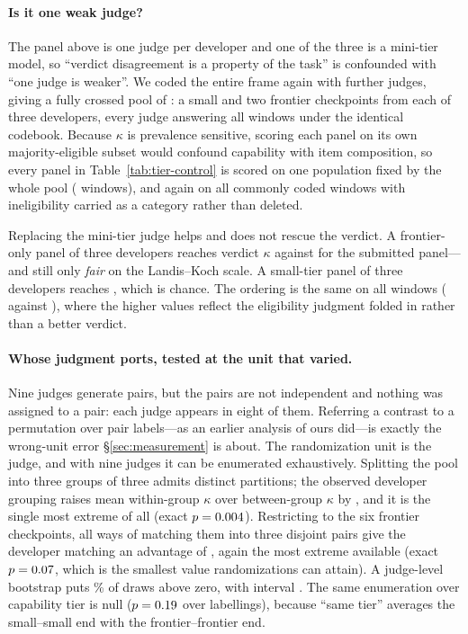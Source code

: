 \documentclass[11pt]{article}
\begin{document}
\paragraph{Is it one weak judge?}
The panel above is one judge per developer and one of the three is a mini-tier
model, so ``verdict disagreement is a property of the task'' is confounded with
``one judge is weaker''. We coded the entire frame again with \TierNew{} further
judges, giving a fully crossed pool of \TierPanelN{}: a small and two frontier
checkpoints from each of three developers, every judge answering all
\FrameCandidates{} windows under the identical codebook. Because $\kappa$ is
prevalence sensitive, scoring each panel on its own majority-eligible subset
would confound capability with item composition, so every panel in
Table~\ref{tab:tier-control} is scored on one population fixed by the whole pool
(\TierCommonItems{} windows), and again on all \TierAllItems{} commonly coded
windows with ineligibility carried as a category rather than deleted.



\noindent Replacing the mini-tier judge helps and does not rescue the verdict. A
frontier-only panel of three developers reaches verdict $\kappa$
\TierFrontierVerdictK{} against \TierSubmittedVerdictK{} for the submitted
panel---and still only \emph{fair} on the Landis--Koch scale. A small-tier panel
of three developers reaches \TierSmallVerdictK{}, which is chance. The ordering
is the same on all \TierAllItems{} windows (\TierFrontierVerdictKAll{} against
\TierSubmittedVerdictKAll{}), where the higher values reflect the eligibility
judgment folded in rather than a better verdict.

\paragraph{Whose judgment ports, tested at the unit that varied.}
Nine judges generate \TierNPairs{} pairs, but the pairs are not independent and
nothing was assigned to a pair: each judge appears in eight of them. Referring a
contrast to a permutation over pair labels---as an earlier analysis of ours
did---is exactly the wrong-unit error \S\ref{sec:measurement} is about. The
randomization unit is the judge, and with nine judges it can be enumerated
exhaustively. Splitting the pool into three groups of three admits
\TierDevRand{} distinct partitions; the observed developer grouping raises mean
within-group $\kappa$ over between-group $\kappa$ by \TierDevDiff{}, and it is
the single most extreme of all \TierDevRand{} (exact $p=0.004$). Restricting
to the six frontier checkpoints, all \TierPairRand{} ways of matching them into
three disjoint pairs give the developer matching an advantage of
\TierPairDiff{}, again the most extreme available (exact $p=0.07$, which
is the smallest value \TierPairRand{} randomizations can attain). A judge-level
bootstrap puts \TierDevBootShare\% of draws above zero, with interval
\TierDevBootCI{}. The same enumeration over capability tier is null
($p=0.19$ over \TierTierRand{} labellings), because ``same tier'' averages
the small--small end with the frontier--frontier end.
\end{document}
